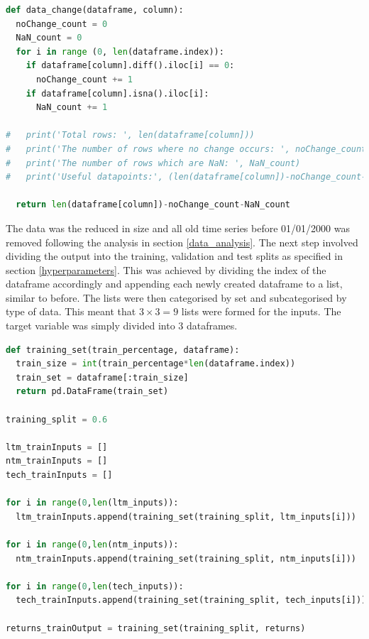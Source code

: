 \documentclass[10pt,onecolumn,letterpaper]{article}
\begin{document}
\begin{lstlisting}[language=Python, breaklines=true, label={datachange}, caption={Identifying the available datapoint counts in differences of $x_{t}$ and $x_{t-1}$.}]
def data_change(dataframe, column): 
  noChange_count = 0
  NaN_count = 0
  for i in range (0, len(dataframe.index)): 
    if dataframe[column].diff().iloc[i] == 0:
      noChange_count += 1
    if dataframe[column].isna().iloc[i]: 
      NaN_count += 1
  
#   print('Total rows: ', len(dataframe[column]))
#   print('The number of rows where no change occurs: ', noChange_count)
#   print('The number of rows which are NaN: ', NaN_count)
#   print('Useful datapoints:', (len(dataframe[column])-noChange_count-NaN_count))

  return len(dataframe[column])-noChange_count-NaN_count
\end{lstlisting} 


The data was the reduced in size and all old time series before 01/01/2000 was removed following the analysis in section \ref{data_analysis}. The next step involved dividing the output into the training, validation and test splits as specified in section \ref{hyperparameters}. This was achieved by dividing the index of the dataframe accordingly and appending each newly created dataframe to a list, similar to before. The lists were then categorised by set and subcategorised by type of data. This meant that $3\times3=9$ lists were formed for the inputs. The target variable was simply divided into 3 dataframes. 

\begin{lstlisting}[language=Python, breaklines=true, caption= {Functionality to split original entire dataset into allocated training split size.}]
def training_set(train_percentage, dataframe): 
  train_size = int(train_percentage*len(dataframe.index)) 
  train_set = dataframe[:train_size]
  return pd.DataFrame(train_set)  

training_split = 0.6

ltm_trainInputs = []
ntm_trainInputs = []
tech_trainInputs = []

for i in range(0,len(ltm_inputs)):
  ltm_trainInputs.append(training_set(training_split, ltm_inputs[i]))
  
for i in range(0,len(ntm_inputs)):
  ntm_trainInputs.append(training_set(training_split, ntm_inputs[i]))

for i in range(0,len(tech_inputs)):
  tech_trainInputs.append(training_set(training_split, tech_inputs[i]))

returns_trainOutput = training_set(training_split, returns)
\end{lstlisting} 
\end{document}
